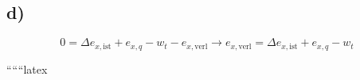 

\subsection*{d)}

\[
0 = \Delta e_{x, \text{ist}} + e_{x, q} - w_t - e_{x, \text{verl}} \rightarrow e_{x, \text{verl}} = \Delta e_{x, \text{ist}} + e_{x, q} - w_t
\]

``````latex